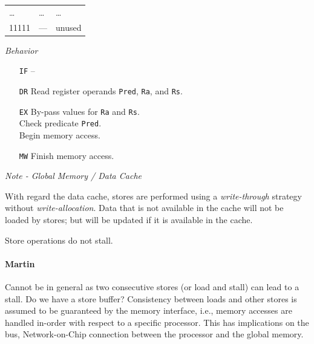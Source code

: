 \documentclass{IEEEtran}
\newcommand{\comment}[3]{\paragraph*{\textbf{#1}}{\color{#3}#2}}
\newcommand{\martin}[1]{\comment{Martin}{#1}{Blue}}
\begin{document}
\begin{tabular}{lll}
  \dots& \dots  & \dots \\
  11111 & ---    & unused \\ \hline
\end{tabular}

\vspace{7mm}
\emph{Behavior}
\begin{itemize}
  \item[\texttt{IF}] --
  \item[\texttt{DR}] Read register operands \texttt{Pred}, \texttt{Ra}, and
                     \texttt{Rs}.
  \item[\texttt{EX}] By-pass values for \texttt{Ra} and \texttt{Rs}. \\
                     Check predicate \texttt{Pred}. \\
                     Begin memory access.
  \item[\texttt{MW}] Finish memory access. \\
\end{itemize}

\vspace{7mm}
\emph{Note - Global Memory / Data Cache}

With regard the data cache, stores are performed using a \emph{write-through}
strategy without \emph{write-allocation}. Data that is not available in the
cache will not be loaded by stores; but will be updated if it is available in
the cache.

Store operations do not stall. \martin{Cannot be in general as two consecutive stores 
(or load and stall) can lead to a stall. Do we have a store buffer?}
Consistency between loads and other stores is
assumed to be guaranteed by the memory interface, i.e., memory accesses are
handled in-order with respect to a specific processor. This has implications on
the bus, Network-on-Chip connection between the processor and the global memory.
\end{document}

